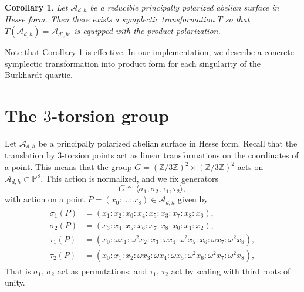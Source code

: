 \documentclass[11pt]{amsart}
\newtheorem{corollary}[theorem]{Corollary}
\theoremstyle{definition}
\newcommand{\A}{\mathcal{A}}
\newcommand{\ZZ}{\mathbb{Z}}
\newcommand{\PP}{\mathbb{P}}
\begin{document}
\begin{corollary} \label{cor:trafo-t-product}
    Let $\A_{d,h}$ be a {\em reducible} principally polarized abelian surface in Hesse form. Then there exists a symplectic transformation $T$ so that $T(\A_{d,h}) = \A_{d',h'}$ is equipped with the product polarization.
\end{corollary}

Note that Corollary \ref{cor:trafo-t-product} is effective. In our implementation,  we describe a concrete symplectic transformation into product form for each singularity of the Burkhardt quartic.
\section{The $3$-torsion group} \label{sec:three-torsion}

Let $\A_{d,h}$ be a principally polarized abelian surface in Hesse form. 
Recall that the translation by  $3$-torsion points act as linear transformations on the coordinates of a point.  This means that the group $G = (\ZZ/3\ZZ)^2 \times (\ZZ/3\ZZ)^2$ acts on $\A_{d,h} \subset \PP^8$. This action is normalized, and we fix generators
\[
G \cong \langle \sigma_1, \sigma_2, \tau_1, \tau_2 \rangle,
\] with action on a point $P = (x_0: \dots : x_8) \in \A_{d,h}$ given by
\begin{align}
	\label{eq:action-by-3-torsion}
	\begin{split}
		\sigma_1(P) &= (x_1 : x_2: x_0 : x_4 : x_5 : x_3 : x_7 : x_8 : x_6),\\
		\sigma_2(P) &= (x_3 : x_4: x_5 : x_6 : x_7 : x_8 : x_0 : x_1 : x_2),\\
		\tau_1(P) & = (x_0 : \omega x_1 : \omega^2x_2 : x_3 : \omega x_4 : \omega^2 x_5 : x_6 : \omega x_7 : \omega^2 x_8),\\
		\tau_2(P) & = (x_0 : x_1 : x_2 : \omega x_3 : \omega x_4 : \omega x_5 : \omega^2x_6 : \omega^2x_7 : \omega^2x_8),
	\end{split}
\end{align}
That is  $\sigma_1$, $\sigma_2$ act as permutations; and $\tau_1$, $\tau_2$ act by scaling with third roots of unity. 
\end{document}
